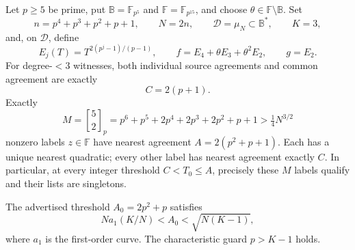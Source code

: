 \begin{theorem}
\label{thm:projective-quadratic-line}
Let $p\ge5$ be prime, put $\mathbb B=\mathbb F_{p^5}$ and
$\mathbb F=\mathbb F_{p^{15}}$, and choose
$\theta\in\mathbb F\setminus\mathbb B$. Set
\[
 n=p^4+p^3+p^2+p+1,\qquad N=2n,\qquad
 \mathcal D=\mu_N\subset\mathbb B^*,\qquad K=3,
\]
and, on $\mathcal D$, define
\[
 E_j(T)=T^{2(p^j-1)/(p-1)},\qquad
 f=E_4+\theta E_3+\theta^2E_2,\qquad g=E_2.
\]
For degree-$<3$ witnesses, both individual source agreements and common
agreement are exactly
\[
 C=2(p+1).
\]
Exactly
\[
 M=\genfrac{[}{]}{0pt}{}{5}{2}_p
   =p^6+p^5+2p^4+2p^3+2p^2+p+1
   >\tfrac14 N^{3/2}
\]
nonzero labels $z\in\mathbb F$ have nearest agreement
$A=2(p^2+p+1)$. Each has a unique nearest quadratic; every other label
has nearest agreement exactly $C$. In particular, at every integer
threshold $C<T_0\le A$, precisely these $M$ labels qualify and their
lists are singletons.

The advertised threshold $A_0=2p^2+p$ satisfies
\[
 N a_1(K/N)<A_0<\sqrt{N(K-1)},
\]
where $a_1$ is the first-order curve. The characteristic guard
$p>K-1$ holds.
\end{theorem}
